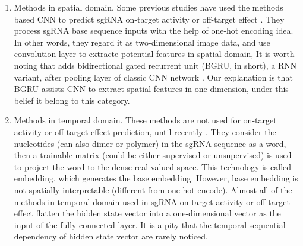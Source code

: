 \documentclass{bioinfo}
\begin{document}
\begin{enumerate}
    \item Methods in spatial domain. 
    Some previous studies have used the methods based CNN to predict sgRNA on-target activity or off-target effect \citep{chuai2018deepcrispr,kim2018deep,lin2018off-target}. 
    They process sgRNA base sequence inputs with the help of one-hot encoding idea. 
    In other words, they regard it as two-dimensional image data, and use convolution layer to extracte potential features in spatial domain, 
    It is worth noting that \citeauthor{zhang2020c-rnncrispr:} adds bidirectional gated recurrent unit (BGRU, in short), a RNN variant, after pooling layer of classic CNN network \citep{zhang2020c-rnncrispr:}. 
    Our explanation is that BGRU assists CNN to extract spatial features in one dimension, under this belief it belong to this category. 
    \item Methods in temporal domain. 
    These methods are not used for on-target activity or off-target effect prediction, until recently \citep{Liu2019,wang2019optimized,liu2020deep}. 
    They consider the nucleotides (can also dimer or polymer) in the sgRNA sequence as a word, then a trainable matrix (could be either supervised or unsupervised) is used to project the word to the dense real-valued space. 
    This technology is called embedding, which generates the base embedding. 
    However, base embedding is not spatially interpretable (different from one-hot encode). 
    Almost all of the methods in temporal domain used in sgRNA on-target activity or off-target effect flatten the hidden state vector into a one-dimensional vector as the input of the fully connected layer. 
    It is a pity that the temporal sequential dependency of hidden state vector are rarely noticed. 
\end{enumerate}
\end{document}
